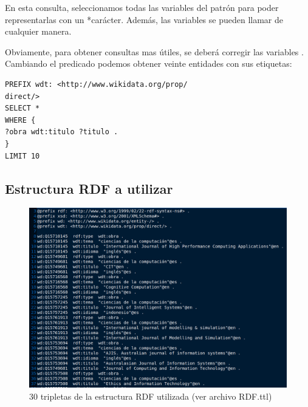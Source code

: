 \documentclass[conference]{IEEEtran}
\begin{document}
En esta consulta, seleccionamos todas las variables del patrón para poder representarlas con un *carácter. Además, las variables se pueden llamar de cualquier manera.

Obviamente, para obtener consultas mas útiles, se deberá corregir las variables . Cambiando el predicado podemos obtener veinte entidades con sus etiquetas:


\begin{lstlisting}[captionpos=b, caption=SPARQL query, label=lst:sparql,
basicstyle=\ttfamily,frame=single]
PREFIX wdt: <http://www.wikidata.org/prop/
direct/> 
SELECT *
WHERE {
?obra wdt:titulo ?titulo . 
}
LIMIT 10
\end{lstlisting}
\subsection{Estructura RDF a utilizar}

\begin{figure}[h]
\includegraphics[scale=0.2]{imagenes/estruc_rdf_30.png} 
\caption{30 tripletas de la estructura RDF utilizada (ver archivo RDF.ttl) }
\end{figure} 
\end{document}
